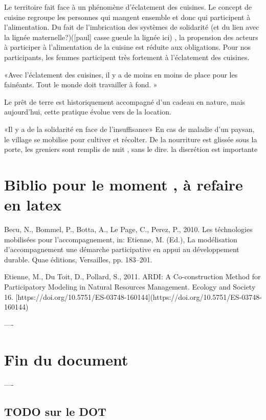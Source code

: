 Le territoire fait face à un phénomène d’éclatement des cuisines. Le concept de cuisine regroupe les personnes qui mangent ensemble et donc qui participent à l’alimentation. Du fait de l’imbrication des systèmes de solidarité (et du lien avec la lignée maternelle?)([paul] casse gueule la lignée ici) , la propension des acteurs à participer à l’alimentation de la cuisine est réduite aux obligations. Pour nos participants, les femmes participent très fortement à l’éclatement des cuisines.

«Avec l’éclatement des cuisines, il y a de moins en moins de place pour les fainéants. Tout le monde doit travailler à fond. »


Le prêt de terre est historiquement accompagné d’un cadeau en nature, mais aujourd’hui, cette pratique évolue vers de la location.

«Il y a de la solidarité en face de l’insuffisance»
En cas de maladie d’un paysan, le village se mobilise pour cultiver et récolter.
De la nourriture est glissée sous la porte, les greniers sont remplis de nuit , sans le dire.
la discrétion est importante


\section{Biblio pour le moment , à refaire en latex}

Becu, N., Bommel, P., Botta, A., Le Page, C., Perez, P., 2010. Les téchnologies mobilisées pour l’accompagnement, in: Etienne, M. (Ed.), La modélisation d’accompagnement une démarche participative en appui au développement durable. Quae éditions, Versailles, pp. 183–201.

Etienne, M., Du Toit, D., Pollard, S., 2011. ARDI: A Co-construction Method for Participatory Modeling in Natural Resources Management. Ecology and Society 16. [https://doi.org/10.5751/ES-03748-160144](https://doi.org/10.5751/ES-03748-160144)

----

\section{ Fin du document }

----

\subsection{ TODO sur le DOT}



